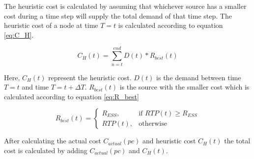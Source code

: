 The heuristic cost is calculated by assuming that whichever source has a smaller cost during a time step will supply the total demand of that time step. The heuristic cost of a node at time $T = t$ is calculated according to equation \ref{eq:C_H}.


\begin{equation}
\label{eq:C_H}
C_H(t) = \sum_{n=t}^{end} D(t)*R_{best}(t)
\end{equation}

Here, $C_H(t)$ represent the heuristic cost. $D(t)$ is the demand between time $T = t$ and time $T = t+\Delta T$. $R_{best}(t)$ is the source with the smaller cost which is calculated according to equation \ref{eq:R_best}

\begin{equation}
\label{eq:R_best}
R_{best}(t) = 
\begin{cases}
    R_{ESS},& \text{if } RTP(t)\geq R_{ESS}\\
    RTP(t),              & \text{otherwise}
\end{cases}
\end{equation}

After calculating the actual cost  $C_{actual}(pc)$ and heuristic cost $C_H(t)$ the total cost is calculated by adding  $C_{actual}(pc)$ and $C_H(t)$.

